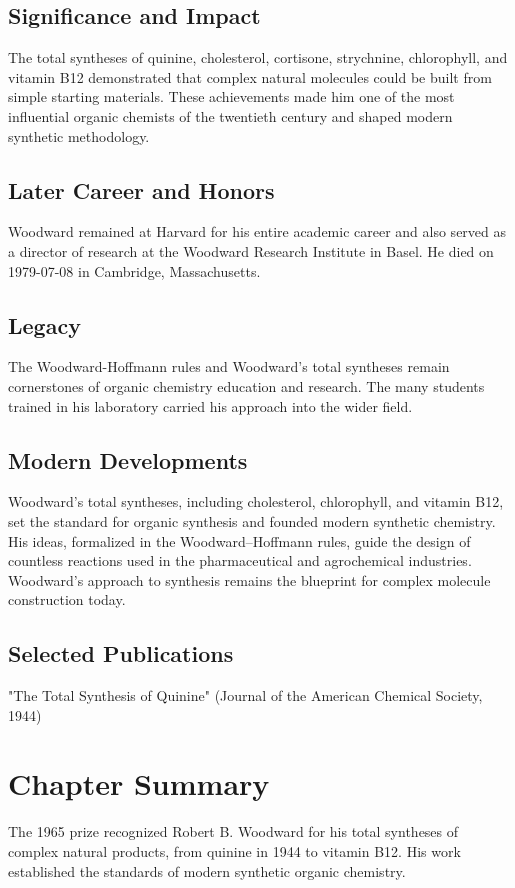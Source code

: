 \subsection*{Significance and Impact}

The total syntheses of quinine, cholesterol, cortisone, strychnine, chlorophyll, and vitamin B12 demonstrated that complex natural molecules could be built from simple starting materials. These achievements made him one of the most influential organic chemists of the twentieth century and shaped modern synthetic methodology.

\subsection*{Later Career and Honors}

Woodward remained at Harvard for his entire academic career and also served as a director of research at the Woodward Research Institute in Basel. He died on 1979-07-08 in Cambridge, Massachusetts.

\subsection*{Legacy}

The Woodward-Hoffmann rules and Woodward's total syntheses remain cornerstones of organic chemistry education and research. The many students trained in his laboratory carried his approach into the wider field.

\subsection*{Modern Developments}

Woodward's total syntheses, including cholesterol, chlorophyll, and vitamin B12, set the standard for organic synthesis and founded modern synthetic chemistry. His ideas, formalized in the Woodward–Hoffmann rules, guide the design of countless reactions used in the pharmaceutical and agrochemical industries. Woodward's approach to synthesis remains the blueprint for complex molecule construction today.

\subsection*{Selected Publications}

"The Total Synthesis of Quinine" (Journal of the American Chemical Society, 1944)

\clearpage

\section*{Chapter Summary}

The 1965 prize recognized Robert B. Woodward for his total syntheses of complex natural products, from quinine in 1944 to vitamin B12. His work established the standards of modern synthetic organic chemistry.
